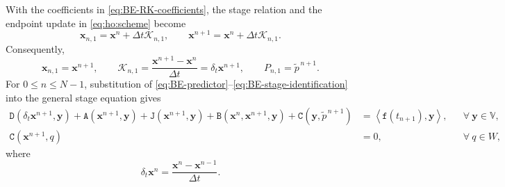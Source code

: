 \documentclass[11pt,a4paper]{article}
\newcommand{\bs}{\boldsymbol}
\newcommand{\dt}{\Delta t}
\newcommand{\V}{\mathbb V}
\newcommand{\DD}{\mathtt D}
\newcommand{\Aform}{\mathtt A}
\newcommand{\JJ}{\mathtt J}
\newcommand{\BB}{\mathtt B}
\newcommand{\CC}{\mathtt C}
\newcommand{\ff}{\mathtt f}
\newcommand{\pp}{\widetilde p}
\newcommand{\dual}[2]{\left\langle#1,#2\right\rangle}
\theoremstyle{definition}
\numberwithin{equation}{section}
\begin{document}
With the coefficients in \eqref{eq:BE-RK-coefficients}, the stage
relation and the endpoint update in \eqref{eq:ho:scheme} become
\[
 \bs x_{n,1}=\bs x^n+\dt\mathcal K_{n,1},
 \qquad
 \bs x^{n+1}=\bs x^n+\dt\mathcal K_{n,1}.
\]
Consequently,
\begin{equation}\label{eq:BE-stage-identification}
 \bs x_{n,1}=\bs x^{n+1},\qquad
 \mathcal K_{n,1}
 =\frac{\bs x^{n+1}-\bs x^n}{\dt}
 =\delta_t\bs x^{n+1},\qquad
 P_{n,1}=\pp^{\,n+1}.
\end{equation}
For $0 \le n\le N-1$, substitution of
\eqref{eq:BE-predictor}--\eqref{eq:BE-stage-identification}
into the general stage equation gives
\begin{equation}\label{eq:first-order-eq}
\begin{aligned}
 \DD(\delta_t\bs x^{n+1},\bs y)
 +\Aform(\bs x^{n+1},\bs y)
 +\JJ(\bs x^{n+1},\bs y)
 +\BB(\bs x^n,\bs x^{n+1},\bs y)
 +\CC(\bs y,\pp^{\,n+1})
 &=
 \dual{\ff(t_{n+1})}{\bs y}, & & \forall~\bs y \in \V,\\
 \CC(\bs x^{n+1},q)&=0, & & \forall~q \in W,
\end{aligned}
\end{equation}
where
\[
 \delta_t\bs x^n=\frac{\bs x^n-\bs x^{n-1}}{\dt}.
\]
\end{document}
